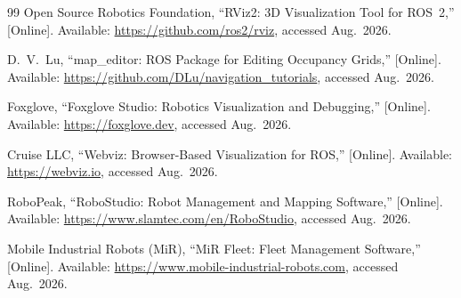 \documentclass[journal]{IEEEtran}
\begin{document}
\begin{thebibliography}{99}
Open Source Robotics Foundation,
``RViz2: 3D Visualization Tool for ROS~2,''
[Online]. Available: \url{https://github.com/ros2/rviz}, accessed Aug.\ 2026.

D.~V.~Lu,
``map\_editor: ROS Package for Editing Occupancy Grids,''
[Online]. Available: \url{https://github.com/DLu/navigation_tutorials},
accessed Aug.\ 2026.

Foxglove,
``Foxglove Studio: Robotics Visualization and Debugging,''
[Online]. Available: \url{https://foxglove.dev}, accessed Aug.\ 2026.

Cruise LLC,
``Webviz: Browser-Based Visualization for ROS,''
[Online]. Available: \url{https://webviz.io}, accessed Aug.\ 2026.

RoboPeak,
``RoboStudio: Robot Management and Mapping Software,''
[Online]. Available: \url{https://www.slamtec.com/en/RoboStudio},
accessed Aug.\ 2026.

Mobile Industrial Robots (MiR),
``MiR Fleet: Fleet Management Software,''
[Online]. Available: \url{https://www.mobile-industrial-robots.com},
accessed Aug.\ 2026.

\end{thebibliography}
\end{document}
